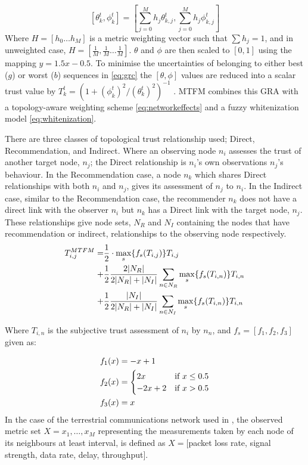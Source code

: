 %
\begin{equation}
\label{eq:metric_weighting}
[\theta_k^t, \phi_k^t] = \left[\sum_{j=0}^M h_j \theta_{k,j}^t,\sum_{j=0}^M h_j \phi_{k,j}^t \right]
\end{equation}
%
Where $H=[h_0\dots h_M]$ is a metric weighting vector such that $\sum h_j = 1$, and in unweighted case, $H=[\frac{1}{M},\frac{1}{M}\dots\frac{1}{M}]$.
$\theta$ and $\phi$ are then scaled to $[0,1]$ using the mapping $y = 1.5 x - 0.5$.
To minimise the uncertainties of belonging to either best ($g$) or worst ($b$) sequences in \eqref{eq:grc} the $[\theta,\phi]$ values are reduced into a scalar trust value by $T_k^t = ({1+{(\phi_k^t)^2}/{(\theta_k^t)^2}})^{-1}$ \cite{Hong2010}.
MTFM combines this GRA with a topology-aware weighting scheme \eqref{eq:networkeffects} and a fuzzy whitenization model \eqref{eq:whitenization}. 

There are three classes of topological trust relationship used; Direct, Recommendation, and Indirect.
Where an observing node $n_i$ assesses the trust of another target node, $n_j$; the Direct relationship is $n_i$'s own observations $n_j$'s behaviour.
In the Recommendation case, a node $n_k$ which shares Direct relationships with both $n_i$ and $n_j$, gives its assessment of $n_j$ to $n_i$.
In the Indirect case, similar to the Recommendation case, the recommender $n_k$ does not have a direct link with the observer $n_i$ but $n_k$ has a Direct link with the target node, $n_j$.
These relationships give node sets, $N_R$ and $N_I$ containing the nodes that have recommendation or indirect, relationships to the observing node respectively.
%
\begin{align}
\label{eq:networkeffects}
T_{i,j}^{MTFM}=&\frac{1}{2} \cdot \max_s\{f_s(T_{i,j})\} T_{i,j}\\ \notag
+&\frac{1}{2} \frac{2|N_R| }{2|N_R| + |N_I|}\sum_{n \in N_R} \max_s\{f_s(T_{i,n})\} T_{i,n}\\ \notag
+&\frac{1}{2} \frac{|N_I| }{2|N_R| + |N_I|}\sum_{n \in N_I} \max_s\{f_s(T_{i,n})\} T_{i,n} 
\end{align}

Where $T_{i,n}$ is the subjective trust assessment of $n_i$ by $n_n$, and $f_s = [ f_1,f_2, f_3]$ given as:

\begin{align}
\label{eq:whitenization}
f_1(x)&= -x+1\notag\\
f_2(x)&= 
\begin{cases}
2x & \text{if }x\leq 0.5\\
-2x+2 & \text{if }x>0.5
\end{cases}\\
f_3(x)&= x\notag
\end{align}
%
In the case of the terrestrial communications network used in \cite{Guo11}, the observed metric set $X = {x_1,\dots,x_M}$ representing the measurements taken by each node of its neighbours at least interval, is defined as $X=[$packet loss rate, signal strength, data rate, delay, throughput$]$.

